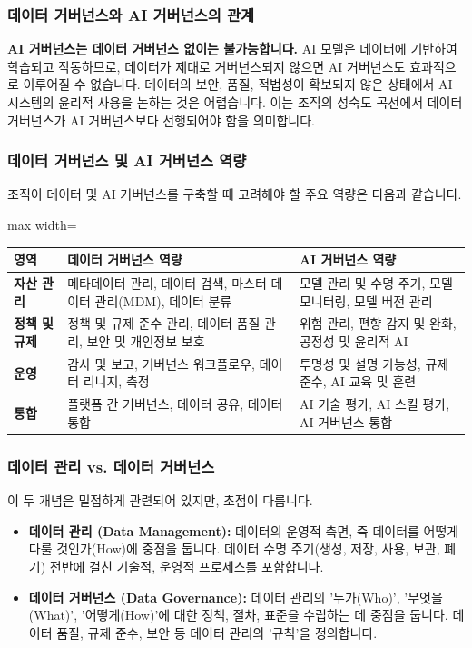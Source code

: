\documentclass[11pt,a4paper]{article}
\theoremstyle{definition}
\begin{document}
\subsubsection*{데이터 거버넌스와 AI 거버넌스의 관계}
\begin{cautionbox}
\textbf{AI 거버넌스는 데이터 거버넌스 없이는 불가능합니다.}
AI 모델은 데이터에 기반하여 학습되고 작동하므로, 데이터가 제대로 거버넌스되지 않으면 AI 거버넌스도 효과적으로 이루어질 수 없습니다. 데이터의 보안, 품질, 적법성이 확보되지 않은 상태에서 AI 시스템의 윤리적 사용을 논하는 것은 어렵습니다. 이는 조직의 성숙도 곡선에서 데이터 거버넌스가 AI 거버넌스보다 선행되어야 함을 의미합니다.
\end{cautionbox}

\subsubsection*{데이터 거버넌스 및 AI 거버넌스 역량}
조직이 데이터 및 AI 거버넌스를 구축할 때 고려해야 할 주요 역량은 다음과 같습니다.

\begin{adjustbox}{max width=\textwidth}
\begin{tabular}{p{}p{}p{}}
\toprule
\textbf{영역} & \textbf{데이터 거버넌스 역량} & \textbf{AI 거버넌스 역량} \\
\midrule
\textbf{자산 관리} & 메타데이터 관리, 데이터 검색, 마스터 데이터 관리(MDM), 데이터 분류 & 모델 관리 및 수명 주기, 모델 모니터링, 모델 버전 관리 \\
\textbf{정책 및 규제} & 정책 및 규제 준수 관리, 데이터 품질 관리, 보안 및 개인정보 보호 & 위험 관리, 편향 감지 및 완화, 공정성 및 윤리적 AI \\
\textbf{운영} & 감사 및 보고, 거버넌스 워크플로우, 데이터 리니지, 측정 & 투명성 및 설명 가능성, 규제 준수, AI 교육 및 훈련 \\
\textbf{통합} & 플랫폼 간 거버넌스, 데이터 공유, 데이터 통합 & AI 기술 평가, AI 스킬 평가, AI 거버넌스 통합 \\
\bottomrule
\end{tabular}
\end{adjustbox}
\label{tab:gov_capabilities}

\subsubsection*{데이터 관리 vs. 데이터 거버넌스}
이 두 개념은 밀접하게 관련되어 있지만, 초점이 다릅니다.
\begin{itemize}
    \item \textbf{데이터 관리 (Data Management):} 데이터의 운영적 측면, 즉 데이터를 어떻게 다룰 것인가(How)에 중점을 둡니다. 데이터 수명 주기(생성, 저장, 사용, 보관, 폐기) 전반에 걸친 기술적, 운영적 프로세스를 포함합니다.
    \item \textbf{데이터 거버넌스 (Data Governance):} 데이터 관리의 '누가(Who)', '무엇을(What)', '어떻게(How)'에 대한 정책, 절차, 표준을 수립하는 데 중점을 둡니다. 데이터 품질, 규제 준수, 보안 등 데이터 관리의 '규칙'을 정의합니다.
\end{itemize}
\end{document}
